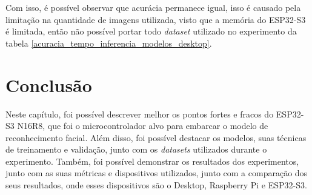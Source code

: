 Com isso, é possível observar que acurácia permanece igual, isso é causado pela limitação na
quantidade de imagens utilizada, visto que a memória do ESP32-S3 é limitada, então não possível
portar todo \textit{dataset} utilizado no experimento da tabela
\autoref{acuracia_tempo_inferencia_modelos_desktop}.


\section{Conclusão}
Neste capítulo, foi possível descrever melhor os pontos fortes e fracos do ESP32-S3 N16R8, que foi o microcontrolador
alvo para embarcar o modelo de reconhecimento facial. Além disso, foi possível destacar os modelos, suas técnicas de
treinamento e validação, junto com os \textit{datasets} utilizados durante o experimento. Também, foi possível demonstrar
os resultados dos experimentos, junto com as suas métricas e dispositivos utilizados, junto com a comparação dos seus
resultados, onde esses dispositivos são o Desktop, Raspberry Pi e ESP32-S3.
